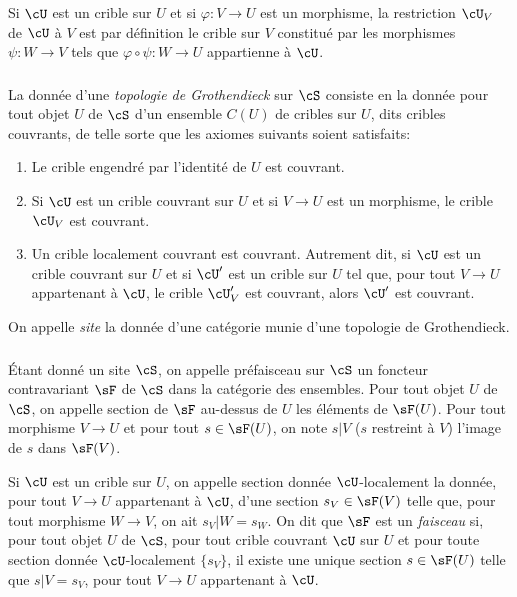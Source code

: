 Si $\cU$ est un crible sur $U$ et si $\varphi:V\to U$ est un morphisme, la 
restriction $\cU_V$ de $\cU$ à $V$ est par définition le crible sur $V$ 
constitué par les morphismes $\psi:W\to V$ tels que 
$\varphi\circ\psi:W\to U$ appartienne à $\cU$.





\subsubsection{}\label{I:1-6-2}

La donnée d'une \emph{topologie de Grothendieck} sur $\cS$ consiste en la 
donnée pour tout objet $U$ de $\cS$ d'un ensemble $C(U)$ de cribles sur $U$, 
dits cribles couvrants, de telle sorte que les axiomes suivants soient 
satisfaits:
\begin{enumerate}[\indent a)]
  \item Le crible engendré par l'identité de $U$ est couvrant.
  \item Si $\cU$ est un crible couvrant sur $U$ et si $V\to U$ est un 
    morphisme, le crible $\cU_V$ est couvrant.
  \item Un crible localement couvrant est couvrant. Autrement dit, si $\cU$ est 
    un crible couvrant sur $U$ et si $\cU'$ est un crible sur $U$ tel que, pour 
    tout $V\to U$ appartenant à $\cU$, le crible $\cU_V'$ est couvrant, alors 
    $\cU'$ est couvrant.
\end{enumerate}

On appelle \emph{site} la donnée d'une catégorie munie d'une topologie de 
Grothendieck.





\subsubsection{}\label{I:1-6-3}

Étant donné un site $\cS$, on appelle préfaisceau sur $\cS$ un foncteur 
contravariant $\sF$ de $\cS$ dans la catégorie des ensembles. Pour tout 
objet $U$ de $\cS$, on appelle section de $\sF$ au-dessus de $U$ les 
éléments de $\sF(U)$. Pour tout morphisme $V\to U$ et pour tout 
$s\in \sF(U)$, on note $s|V$ ($s$ restreint à $V$) l'image de $s$ dans 
$\sF(V)$.

Si $\cU$ est un crible sur $U$, on appelle section donnée $\cU$-localement la 
donnée, pour tout $V\to U$ appartenant à $\cU$, d'une section 
$s_V\in\sF(V)$ telle que, pour tout morphisme $W\to V$, on ait $s_V|W=s_W$. On 
dit que $\sF$ est un \emph{faisceau} si, pour tout objet $U$ de $\cS$, pour 
tout crible couvrant $\cU$ sur $U$ et pour toute section donnée 
$\cU$-localement $\{s_V\}$, il existe une unique section $s\in\sF(U)$ telle que 
$s|V=s_V$, pour tout $V\to U$ appartenant à $\cU$. 

